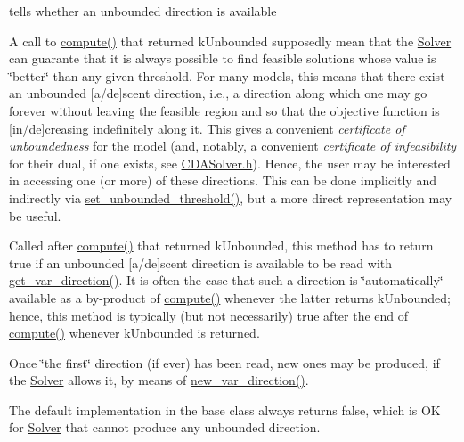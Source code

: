 tells whether an unbounded direction is available 

A call to \mbox{\hyperlink{class_s_m_spp__di__unipi__it_1_1_solver_a504d4e3e174c7a518cc66156a8a45ce5}{compute()}} that returned k\+Unbounded supposedly mean that the \mbox{\hyperlink{class_s_m_spp__di__unipi__it_1_1_solver}{Solver}} can guarante that it is always possible to find feasible solutions whose value is \char`\"{}better\char`\"{} than any given threshold. For many models, this means that there exist an unbounded \mbox{[}a/de\mbox{]}scent direction, i.\+e., a direction along which one may go forever without leaving the feasible region and so that the objective function is \mbox{[}in/de\mbox{]}creasing indefinitely along it. This gives a convenient {\itshape certificate of unboundedness} for the model (and, notably, a convenient {\itshape certificate of infeasibility} for their dual, if one exists, see \mbox{\hyperlink{_c_d_a_solver_8h}{C\+D\+A\+Solver.\+h}}). Hence, the user may be interested in accessing one (or more) of these directions. This can be done implicitly and indirectly via \mbox{\hyperlink{class_s_m_spp__di__unipi__it_1_1_solver_ae1717d1363782e086aa797e7437c0352}{set\+\_\+unbounded\+\_\+threshold()}}, but a more direct representation may be useful.

Called after \mbox{\hyperlink{class_s_m_spp__di__unipi__it_1_1_solver_a504d4e3e174c7a518cc66156a8a45ce5}{compute()}} that returned k\+Unbounded, this method has to return true if an unbounded \mbox{[}a/de\mbox{]}scent direction is available to be read with \mbox{\hyperlink{class_s_m_spp__di__unipi__it_1_1_solver_a4bc119810c0c2ee3ba0c48183f50aaf4}{get\+\_\+var\+\_\+direction()}}. It is often the case that such a direction is \char`\"{}automatically\char`\"{} available as a by-\/product of \mbox{\hyperlink{class_s_m_spp__di__unipi__it_1_1_solver_a504d4e3e174c7a518cc66156a8a45ce5}{compute()}} whenever the latter returns k\+Unbounded; hence, this method is typically (but not necessarily) true after the end of \mbox{\hyperlink{class_s_m_spp__di__unipi__it_1_1_solver_a504d4e3e174c7a518cc66156a8a45ce5}{compute()}} whenever k\+Unbounded is returned.

Once \char`\"{}the first\char`\"{} direction (if ever) has been read, new ones may be produced, if the \mbox{\hyperlink{class_s_m_spp__di__unipi__it_1_1_solver}{Solver}} allows it, by means of \mbox{\hyperlink{class_s_m_spp__di__unipi__it_1_1_solver_a673fc1c81a1fc86e55dfab3a37f303bc}{new\+\_\+var\+\_\+direction()}}.

The default implementation in the base class always returns false, which is OK for \mbox{\hyperlink{class_s_m_spp__di__unipi__it_1_1_solver}{Solver}} that cannot produce any unbounded direction. 

